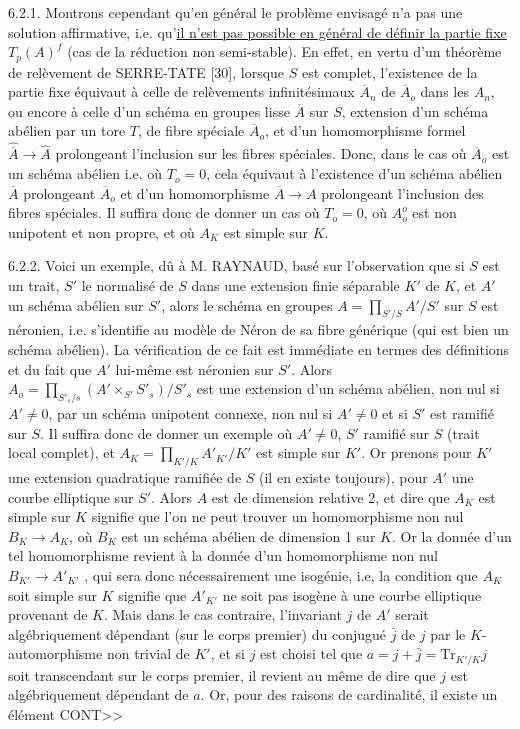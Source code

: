 6.2.1. Montrons cependant qu'en général le problème envisagé n'a pas une solution affirmative, i.e. qu'\underline{il n'est pas possible en général de définir la partie fixe} $T_p(A)^f$ (cas de la réduction non semi-stable). En effet, en vertu d'un théorème de relèvement de SERRE-TATE [30], lorsque $S$ est complet, l'existence de la partie fixe équivaut à celle de relèvements infinitésimaux $\overline{A}_n$ de $\overline{A}_o$ dans les $A_n$, ou encore à celle d'un schéma en groupes lisse $\overline{A}$ sur $S$, extension d'un schéma abélien par un tore $T$, de fibre spéciale $\overline{A}_o$, et d'un homomorphisme formel $\widehat{\overline{A}} \longrightarrow \widehat{A}$ prolongeant l'inclusion sur les fibres spéciales. Donc, dans le cas où $\overline{A}_o$ est un schéma abélien i.e. où $T_o = 0$, cela équivaut à l'existence d'un schéma abélien $\overline{A}$ prolongeant $\overline{A}_o$ et d'un homomorphisme $\overline{A} \longrightarrow A$ prolongeant l'inclusion des fibres spéciales. Il suffira donc de donner un cas où $T_o = 0$, où $A_o^o$ est non unipotent et non propre, et où $A_K$ est simple sur $K$.



6.2.2. Voici un exemple, dû à M. RAYNAUD, basé sur l'observation que si $S$ est un trait, $S'$ le normalisé de $S$ dans une extension finie séparable $K'$ de $K$, et $A'$ un schéma abélien sur $S'$, alors le schéma en groupes $A = \prod_{S'/S} A'/S'$ sur $S$ est néronien, i.e. s'identifie au modèle de Néron de sa fibre générique (qui est bien un schéma abélien). La vérification de ce fait est immédiate en termes des définitions et du fait que $A'$ lui-même est néronien sur $S'$. Alors $A_o = \prod_{S'_s/s}(A' \times_{S'} S'_s)/S'_s$ est une extension d'un schéma abélien, non nul si $A' \neq 0$, par un schéma unipotent connexe, non nul si $A' \neq 0$ et si $S'$ est ramifié sur $S$. Il suffira donc de donner un exemple où $A' \neq 0$, $S'$ ramifié sur $S$ (trait local complet), et $A_K = \prod_{K'/K} A'_{K'}/K'$ est simple sur $K'$. Or prenons pour $K'$ une extension quadratique ramifiée de $S$ (il en existe toujours), pour $A'$ une courbe elliptique sur $S'$. Alors $A$ est de dimension relative 2, et dire que $A_K$ est simple sur $K$ signifie que l'on ne peut trouver un homomorphisme non nul $B_K \longrightarrow A_K$, où $B_K$ est un schéma abélien de dimension 1 sur $K$. Or la donnée d'un tel homomorphisme revient à la donnée d'un homomorphisme non nul $B_{K'} \longrightarrow A'_{K'}$ , qui sera donc nécessairement une isogénie, i.e, la condition que $A_K$ soit simple sur $K$ signifie que $A'_{K'}$ ne soit pas isogène à une courbe elliptique provenant de $K$. Mais dans le cas contraire, l'invariant $j$ de $A'$ serait algébriquement dépendant (sur le corps premier) du conjugué $\bar{j}$ de $j$ par le $K$-automorphisme non trivial de $K'$, et si $j$ est choisi tel que $a = j + \bar{j} = \mathrm{Tr}_{K'/K} j$ soit transcendant sur le corps premier, il revient au même de dire que $j$ est algébriquement dépendant de $a$. Or, pour des raisons de cardinalité, il existe un élément CONT>>


